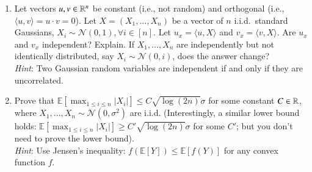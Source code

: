 \documentclass[11pt]{article}
\begin{document}
\begin{enumerate}
    
    
    \item Let vectors $u,v\in\mathbb{R}^n$ be constant (i.e., not random) and orthogonal (i.e., $\langle u, v \rangle = u \cdot v = 0$). Let $X = (X_1,\dots,X_n)$ be a vector of $n$ i.i.d.\ standard Gaussians, $X_i\sim \mathcal{N}(0,1), \forall i\in[n]$. Let $u_x = \langle u, X \rangle$ and $v_x = \langle v,X\rangle$. Are $u_x$ and $v_x$ independent? Explain. If ${X_1, \dots, X_n}$ are independently but not identically distributed, say $X_i \sim \mathcal{N}(0,i)$, does the answer change? \\
    \emph{Hint}: Two Gaussian random variables are independent if and only if they are uncorrelated.
    
    
    
    \item Prove that $\mathbb{E} \left[\max_{1\leq i\leq n} |X_i|\right] \leq C \sqrt{\log (2n)} \sigma$ for some constant $C \in \mathbb{R}$, where $X_1,\dots,X_n\sim \mathcal{N}(0,\sigma^2)$ are i.i.d. (Interestingly, a similar lower bound holds: $\mathbb{E} \left[\max_{1\leq i\leq n} |X_i|\right] \geq C' \sqrt{\log (2n)} \sigma$ for some $C'$; but you don't need to prove the lower bound).\\

    \emph{Hint}: Use Jensen's inequality: $f(\mathbb{E}[Y])\leq \mathbb{E}[f(Y)]$ for any convex function $f$. 
    
    

\end{enumerate}
\newpage
{}

\newcommand{\rank}{\mathrm{rank}\,}
\newcommand{\trac}{\mathrm{trace}\,}
\end{document}
